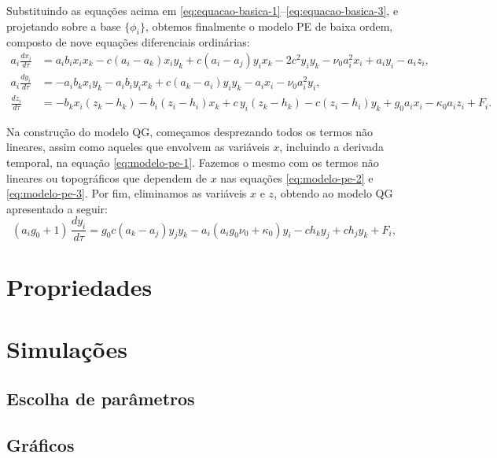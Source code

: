 Substituindo as equações acima em \eqref{eq:equacao-basica-1}–\eqref{eq:equacao-basica-3}, e projetando sobre a base $\{\phi_i\}$, obtemos finalmente o modelo PE de baixa ordem, composto de nove equações diferenciais ordinárias:
\begin{align}
    a_i\frac{dx_i}{d\tau} & = a_ib_ix_ix_k - c(a_i - a_k)x_iy_k      
	+ c(a_i - a_j)y_ix_k -2c^2y_iy_k - \nu_0a_i^2x_i + a_iy_i - a_iz_i, \label{eq:modelo-pe-1}\\
	a_i\frac{dy_i}{d\tau} & = -a_ib_kx_iy_k - a_ib_iy_ix_k           
	+ c(a_k - a_i)y_iy_k - a_ix_i - \nu_0a_i^2y_i, \label{eq:modelo-pe-2}\\
	\frac{dz_i}{d\tau}    & = -b_kx_i(z_k - h_k) - b_i(z_i - h_i)x_k 
	+ c\,y_i(z_k - h_k) - c(z_i - h_i)y_k + g_0a_ix_i - \kappa_0a_iz_i + F_i. \label{eq:modelo-pe-3}
\end{align}

Na construção do modelo QG, começamos desprezando todos os termos não lineares, assim como aqueles que envolvem as variáveis $x$, incluindo a derivada temporal, na equação \eqref{eq:modelo-pe-1}. Fazemos o mesmo com os termos não lineares ou topográficos que dependem de $x$ nas equações \eqref{eq:modelo-pe-2} e \eqref{eq:modelo-pe-3}. Por fim, eliminamos as variáveis $x$ e $z$, obtendo ao modelo QG apresentado a seguir:
\begin{equation}
	(a_i g_0 + 1)\,\frac{dy_i}{d\tau} 
	= g_0 c (a_k - a_j) y_j y_k 
	- a_i (a_i g_0 \nu_0 + \kappa_0) y_i 
	- c h_k y_j + c h_j y_k + F_i,
	\label{eq:modelo_lorenz_deterministico_qg}
\end{equation}

\section{Propriedades} \label{sec:ch01_prop_do_modelo}

\section{Simulações} \label{sec:ch01_simulacoes_deterministico}
\subsection{Escolha de parâmetros} \label{subsec:ch01_escolha_parametros}
\subsection{Gráficos} \label{subsec:ch01_graficos_simulacao}
